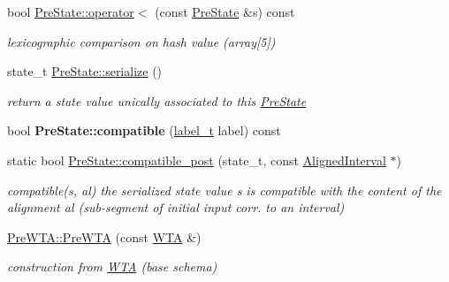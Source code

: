 \begin{DoxyCompactItemize}
\mbox{\label{group__schemata_gaa39a99008e7809c864be28f89c5ef79b}} 
bool \mbox{\hyperlink{group__schemata_gaa39a99008e7809c864be28f89c5ef79b}{Pre\+State\+::operator$<$}} (const \mbox{\hyperlink{classPreState}{Pre\+State}} \&s) const
\begin{DoxyCompactList}\small\item\em lexicographic comparison on hash value (array\mbox{[}5\mbox{]}) \end{DoxyCompactList}\item 
\mbox{\label{group__schemata_gaa60c0f6f8e237bad468bd8a48c3263f4}} 
state\+\_\+t \mbox{\hyperlink{group__schemata_gaa60c0f6f8e237bad468bd8a48c3263f4}{Pre\+State\+::serialize}} ()
\begin{DoxyCompactList}\small\item\em return a state value unically associated to this \mbox{\hyperlink{classPreState}{Pre\+State}} \end{DoxyCompactList}\item 
\mbox{\label{group__schemata_gab947b64699704a087db2eda3eb47575d}} 
bool {\bfseries Pre\+State\+::compatible} (\mbox{\hyperlink{group__output_ga22fde970e635fcf63962743b2d5c441d}{label\+\_\+t}} label) const
\item 
\mbox{\label{group__schemata_gaa509247277fd021460056bfe6484a5b4}} 
static bool \mbox{\hyperlink{group__schemata_gaa509247277fd021460056bfe6484a5b4}{Pre\+State\+::compatible\+\_\+post}} (state\+\_\+t, const \mbox{\hyperlink{classAlignedInterval}{Aligned\+Interval}} $\ast$)
\begin{DoxyCompactList}\small\item\em compatible(s, al) the serialized state value s is compatible with the content of the alignment al (sub-\/segment of initial input corr. to an interval) \end{DoxyCompactList}\item 
\mbox{\label{group__schemata_ga6287aa82de69987b65518b4997112ac5}} 
\mbox{\hyperlink{group__schemata_ga6287aa82de69987b65518b4997112ac5}{Pre\+W\+T\+A\+::\+Pre\+W\+TA}} (const \mbox{\hyperlink{classWTA}{W\+TA}} \&)
\begin{DoxyCompactList}\small\item\em construction from \mbox{\hyperlink{classWTA}{W\+TA}} (base schema) \end{DoxyCompactList}\item 

\end{DoxyCompactItemize}
